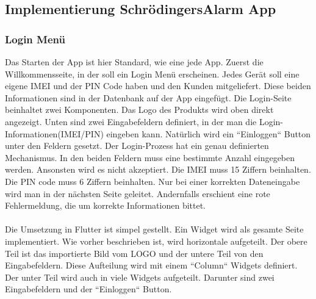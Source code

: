 \subsection{Implementierung SchrödingersAlarm App}
\subsubsection{Login Menü}
Das Starten der App ist hier Standard, wie eine jede App. Zuerst die Willkommensseite, in der soll ein Login Menü erscheinen. 
Jedes Gerät soll eine eigene IMEI und der PIN Code haben und den Kunden mitgeliefert. 
Diese beiden Informationen sind in der Datenbank auf der App eingefügt. Die Login-Seite beinhaltet zwei Komponenten.
Das Logo des Produkts wird oben direkt angezeigt. Unten sind zwei Eingabefeldern definiert,
in der man die Login-Informationen(IMEI/PIN) eingeben kann. Natürlich wird ein “Einloggen“ Button unter den Feldern gesetzt.
Der Login-Prozess hat ein genau definierten Mechanismus. In den beiden Feldern muss eine bestimmte Anzahl eingegeben werden. Ansonsten wird es nicht akzeptiert. Die IMEI muss 15 Ziffern beinhalten.  Die PIN code muss 6 Ziffern beinhalten.  Nur bei einer korrekten Dateneingabe wird man in der nächsten Seite geleitet.
Andernfalls erschient eine rote Fehlermeldung, die um korrekte Informationen bittet.\\\\
Die Umsetzung in Flutter ist simpel gestellt. Ein Widget wird als gesamte Seite implementiert. 
Wie vorher beschrieben ist, wird horizontale aufgeteilt. Der obere Teil ist das importierte Bild vom LOGO und der untere Teil von den Eingabefeldern. 
Diese Aufteilung wird mit einem “Column“ Widgets definiert. Der unter Teil wird auch in viele Widgets aufgeteilt. 
Darunter sind zwei Eingabefeldern und der “Einloggen“ Button.
